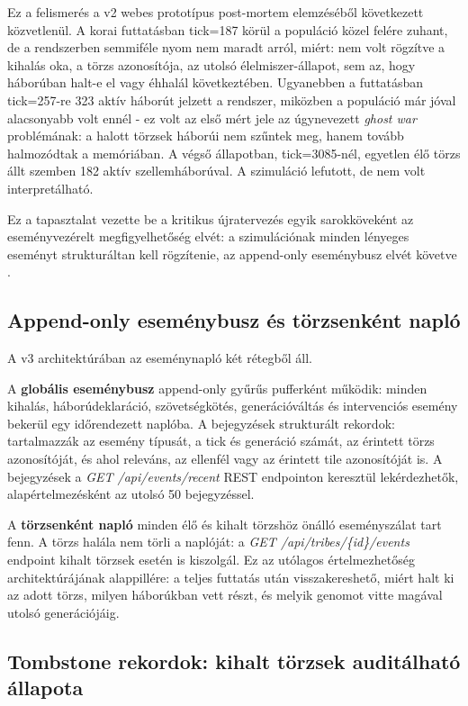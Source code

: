 Ez a felismerés a v2 webes prototípus post-mortem elemzéséből következett közvetlenül.
A korai futtatásban tick=187 körül a populáció közel felére zuhant, de a rendszerben
semmiféle nyom nem maradt arról, miért: nem volt rögzítve a kihalás oka, a törzs azonosítója,
az utolsó élelmiszer-állapot, sem az, hogy háborúban halt-e el vagy éhhalál következtében.
Ugyanebben a futtatásban tick=257-re 323 aktív háborút jelzett a rendszer, miközben
a populáció már jóval alacsonyabb volt ennél - ez volt az első mért jele az úgynevezett
\textit{ghost war} problémának: a halott törzsek háborúi nem szűntek meg,
hanem tovább halmozódtak a memóriában.
A végső állapotban, tick=3085-nél, egyetlen élő törzs állt szemben 182 aktív
szellemháborúval. A szimuláció lefutott, de nem volt interpretálható.

Ez a tapasztalat vezette be a kritikus újratervezés egyik sarokköveként az
eseményvezérelt megfigyelhetőség elvét: a szimulációnak minden lényeges eseményt
strukturáltan kell rögzítenie, az append-only eseménybusz elvét követve \cite{fowler2005}.

\subsection*{Append-only eseménybusz és törzsenként napló}

A v3 architektúrában az eseménynapló két rétegből áll.

A \textbf{globális eseménybusz} append-only gyűrűs pufferként működik: minden kihalás,
háborúdeklaráció, szövetségkötés, generációváltás és intervenciós esemény bekerül
egy időrendezett naplóba. A bejegyzések strukturált rekordok: tartalmazzák az esemény típusát,
a tick és generáció számát, az érintett törzs azonosítóját, és ahol releváns, az ellenfél
vagy az érintett tile azonosítóját is. A bejegyzések a \textit{GET /api/events/recent}
REST endpointon keresztül lekérdezhetők, alapértelmezésként az utolsó 50 bejegyzéssel.

A \textbf{törzsenként napló} minden élő és kihalt törzshöz önálló eseményszálat tart fenn.
A törzs halála nem törli a naplóját: a \textit{GET /api/tribes/\{id\}/events}
endpoint kihalt törzsek esetén is kiszolgál. Ez az utólagos értelmezhetőség
architektúrájának alappillére: a teljes futtatás után visszakereshető, miért halt ki
az adott törzs, milyen háborúkban vett részt, és melyik genomot vitte magával utolsó generációjáig.

\subsection*{Tombstone rekordok: kihalt törzsek auditálható állapota}

